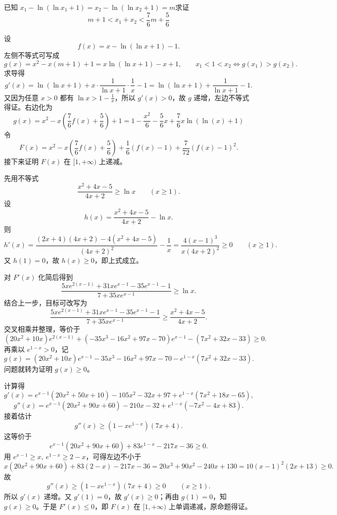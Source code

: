 \begin{example}
已知 $x_{1} - \ln(\ln x_{1} + 1) = x_{2} - \ln(\ln x_{2} + 1) = m$求证\[m + 1 < x_{1} + x_{2} < \frac{7}{6}m + \frac{5}{6}\]
\end{example}
\begin{solution}
    设
    \[
    f(x)=x-\ln(\ln x+1)-1.
    \]
    左侧不等式可写成
    \[
    g(x)=x^2-x(m+1)+1=x\ln(\ln x+1)-x+1,
    \qquad
    x_1<1<x_2\Longleftrightarrow g(x_1)>g(x_2).
    \]
    求导得
    \[
    g'(x)=\ln(\ln x+1)+x\cdot\frac1{\ln x+1}\cdot\frac1x-1=\ln(\ln x+1)+\frac1{\ln x+1}-1.
    \]
    又因为任意 $x>0$ 都有 $\ln x>1-\frac1x$，所以 $g'(x)>0$，故 $g$ 递增，左边不等式得证。右边化为
    \[g(x)=x^2-x\left(\frac{7}{6}f(x) + \frac{5}{6}\right)+1=1-\frac{{x}^{2}}{6}-\frac{5}{6}x+\frac76x\ln(\ln({x})+1)\]
    令
    \[
    F(x) = x^2 - x\left(\frac{7}{6}f(x) + \frac{5}{6}\right) + \frac{1}{6}(f(x) - 1) + \frac{7}{72}(f(x) - 1)^2.
    \]
    接下来证明 $F(x)$ 在 $[1,+\infty)$ 上递减。

    先用不等式
    \[
    \frac{x^2+4x-5}{4x+2}\ge \ln x\qquad (x\ge1).
    \]
    设
    \[
    h(x)=\frac{x^2+4x-5}{4x+2}-\ln x.
    \]
    则
    \[
    h'(x)=\frac{(2x+4)(4x+2)-4(x^2+4x-5)}{(4x+2)^2}-\frac1x
    =\frac{4(x-1)^3}{x(4x+2)^2}\ge0\qquad (x\ge1).
    \]
    又 $h(1)=0$，故 $h(x)\ge0$，即上式成立。

    对 $F'(x)$ 化简后得到
    \[
    \frac{5xe^{2(x-1)} + 31xe^{x-1} - 35e^{x-1} - 1}{7 + 35xe^{x-1}} \ge \ln x.
    \]
    结合上一步，目标可改写为
    \[
    \frac{5xe^{2(x-1)} + 31xe^{x-1} - 35e^{x-1} - 1}{7 + 35xe^{x-1}}
    \ge
    \frac{x^2+4x-5}{4x+2}.
    \]
    交叉相乘并整理，等价于
    \[
    (20x^2+10x)e^{2(x-1)} + (-35x^3-16x^2+97x-70)e^{x-1} - (7x^2+32x-33) \ge 0.
    \]
    再乘以 $e^{1-x}>0$，记
    \[
    g(x)=(20x^2+10x)e^{x-1}-35x^3-16x^2+97x-70-e^{1-x}(7x^2+32x-33).
    \]
    问题就转为证明 $g(x)\ge0$。

    计算得
    \[
    g'(x)=e^{x-1}(20x^2+50x+10)-105x^2-32x+97+e^{1-x}(7x^2+18x-65),
    \]
    \[
    g''(x)=e^{x-1}(20x^2+90x+60)-210x-32+e^{1-x}(-7x^2-4x+83).
    \]
    接着估计
    \[
    g''(x)\ge (1-xe^{1-x})(7x+4).
    \]
    这等价于
    \[
    e^{x-1}(20x^2+90x+60)+83e^{1-x}-217x-36\ge0.
    \]
    用 $e^{x-1}\ge x,\ e^{1-x}\ge2-x$，可得左边不小于
    \[
    x(20x^2+90x+60)+83(2-x)-217x-36
    =20x^3+90x^2-240x+130
    =10(x-1)^2(2x+13)\ge0.
    \]
    故
    \[
    g''(x)\ge (1-xe^{1-x})(7x+4)\ge0\qquad (x\ge1).
    \]
    所以 $g'(x)$ 递增。又 $g'(1)=0$，故 $g'(x)\ge0$；再由 $g(1)=0$，知 $g(x)\ge0$。于是 $F'(x)\le0$，即 $F(x)$ 在 $[1,+\infty)$ 上单调递减，原命题得证。
\end{solution}
